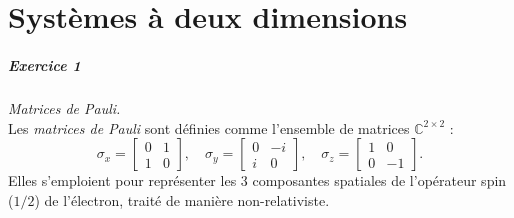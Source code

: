 \chapter{Systèmes à deux dimensions}

\paragraph{Exercice 1} \textit{Matrices de Pauli.} \\
Les \textit{matrices de Pauli} sont définies comme l'ensemble de matrices $\mathbb{C}^{2\times 2}$ :
\begin{equation}
\sigma_x = \left[ 
\begin{array}{cc}
0 & 1 \\ 
1 & 0
\end{array} 
\right], \quad
\sigma_y = \left[ 
\begin{array}{cc}
0 & -i \\ 
i & 0
\end{array} 
\right], \quad
\sigma_z = \left[ 
\begin{array}{cc}
1 & 0 \\ 
0 & -1
\end{array} 
\right].
\end{equation}
Elles s'emploient pour représenter les 3 composantes spatiales de l'opérateur spin ($1/2$) de l'électron, traité de manière non-relativiste. 
